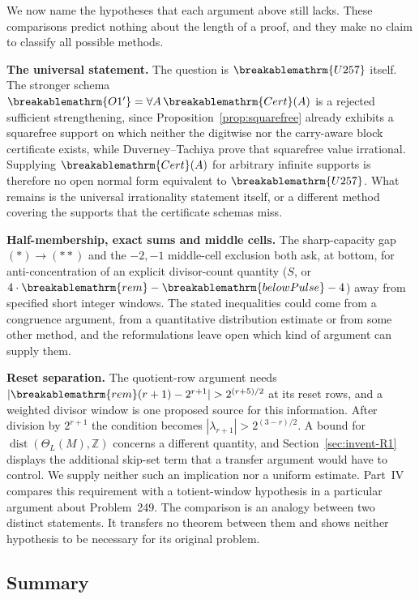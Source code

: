 \documentclass[11pt]{article}
\theoremstyle{plain}
\theoremstyle{definition}
\theoremstyle{remark}
\renewcommand{\mathrm}[1]{\ifmmode\breakablemathrm{#1}\else\textrm{#1}\fi}%
\begin{document}
We now name the hypotheses that each argument above still lacks.  These
comparisons predict nothing about the length of a proof, and they make no
claim to classify all possible methods.

\textbf{The universal statement.} The question is $\mathrm{U257}$ itself. The stronger schema
$\mathrm{O1'}=\forall A\,\mathrm{Cert}(A)$ is a rejected sufficient strengthening, since
Proposition~\ref{prop:squarefree} already exhibits a squarefree support on which neither the
digitwise nor the carry-aware block certificate exists, while Duverney--Tachiya
prove that squarefree value irrational. Supplying $\mathrm{Cert}(A)$ for arbitrary infinite
supports is therefore no open normal form equivalent to $\mathrm{U257}$.  What remains
is the universal irrationality statement itself, or a different method covering the supports
that the certificate schemas miss.

\textbf{Half-membership, exact sums and middle cells.} The sharp-capacity gap $(\ast)\to(\ast\ast)$ and the
$-2,-1$ middle-cell exclusion both ask, at bottom, for anti-concentration of an explicit
divisor-count quantity ($\ensuremath{S}$, or $4\cdot\mathrm{rem}-\mathrm{belowPulse}-4$)
away from specified short integer windows.  The stated inequalities could come from a
congruence argument, from a quantitative distribution estimate or from some other method,
and the reformulations leave open which kind of argument can supply them.

\textbf{Reset separation.} The quotient-row argument
needs $|\mathrm{rem}(r+1)-2^{r+1}|>2^{(r+5)/2}$ at its reset rows,
and a weighted divisor window is one proposed source for this information.
After division by $2^{r+1}$ the condition becomes
$|\lambda_{r+1}|>2^{(3-r)/2}$.  A bound for
$\operatorname{dist}(\Theta_L(M),\mathbb Z)$ concerns a different
quantity, and Section~\ref{sec:invent-R1} displays the additional
skip-set term that a transfer argument would have to control.
We supply neither such an implication nor a uniform estimate.
Part~IV compares this requirement with a totient-window hypothesis in a particular
argument about Problem~249.  The comparison is an analogy between two distinct
statements.  It transfers no theorem between them and shows neither
hypothesis to be necessary for its original problem.

\subsection{Summary}
\end{document}

